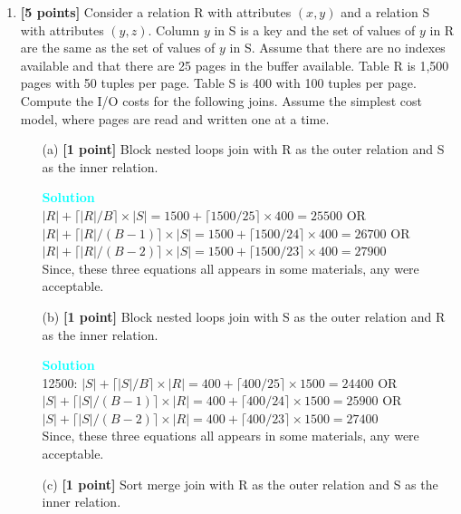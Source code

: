 \documentclass[10pt]{article}
\newenvironment{solution}
    { \begin{mdframed}[backgroundcolor=gray!10] \textcolor{cyan}{\textbf{Solution}} \\}
    {  \end{mdframed}}
\begin{document}
\begin{enumerate}
	\item \textbf{[5 points]}
	      Consider a relation R with attributes $(x,y)$ and a relation S with attributes $(y, z)$.
	      Column $y$ in S is a key and the set of values of $y$ in R are the same as the set of values of $y$ in S.
	      Assume that there are no indexes available and that there are 25 pages in the buffer available.
	      Table R is 1,500 pages with 50 tuples per page. Table S is 400 with 100 tuples per page.
	      Compute the I/O costs for the following joins. Assume the simplest cost model, where pages are read and written one at a time.
	      \begin{itemize}
		      \item[(a)] \textbf{[1 point]} Block nested loops join with R as the outer relation and S as the inner relation.
		            \begin{solution}
			            $|R| + \lceil |R| / B \rceil \times |S| = 1500 + \lceil 1500/25 \rceil \times 400 = 25500$  OR \\
			            $|R| + \lceil |R| / (B-1) \rceil \times |S| = 1500 + \lceil 1500/24 \rceil \times 400 = 26700$ OR \\
			            $|R| + \lceil |R| / (B-2) \rceil \times |S| = 1500 + \lceil 1500/23 \rceil \times 400 = 27900$\\
			            Since, these three equations all appears in some materials, any were acceptable.
		            \end{solution}
		      \item[(b)] \textbf{[1 point]} Block nested loops join with S as the outer relation and R as the inner relation.
		            \begin{solution}
			            12500: $|S| + \lceil |S| / B \rceil \times |R| = 400 + \lceil 400/25 \rceil \times 1500 = 24400$  OR \\
			            $|S| + \lceil |S| / (B-1) \rceil \times |R| = 400 + \lceil 400/24 \rceil \times 1500 = 25900$ OR \\
			            $|S| + \lceil |S| / (B-2) \rceil \times |R| = 400 + \lceil 400/23 \rceil \times 1500 = 27400$\\
			            Since, these three equations all appears in some materials, any were acceptable.
		            \end{solution}
		      \item[(c)] \textbf{[1 point]} Sort merge join with R as the outer relation and S as the inner relation.

\end{itemize}
\end{enumerate}
\end{document}
